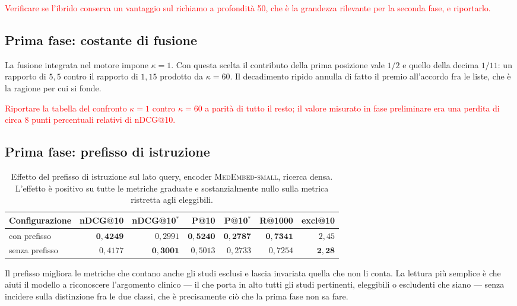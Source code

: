 \documentclass[pdflatex,sn-mathphys-num]{sn-jnl}
\theoremstyle{thmstyleone}
\theoremstyle{thmstyletwo}
\theoremstyle{thmstylethree}
\newcommand{\ev}[1]{\textcolor{red}{#1}}
\begin{document}
\ev{Verificare se l'ibrido conserva un vantaggio sul richiamo a profondità 50, che è la grandezza rilevante per la seconda fase, e riportarlo.}

\subsection{Prima fase: costante di fusione}\label{sec:res-rrf}

La fusione integrata nel motore impone $\kappa = 1$. Con questa scelta il contributo della prima posizione vale $1/2$ e quello della decima $1/11$: un rapporto di $5{,}5$ contro il rapporto di $1{,}15$ prodotto da $\kappa = 60$. Il decadimento ripido annulla di fatto il premio all'accordo fra le liste, che è la ragione per cui si fonde.

\ev{Riportare la tabella del confronto $\kappa = 1$ contro $\kappa = 60$ a parità di tutto il resto; il valore misurato in fase preliminare era una perdita di circa 8 punti percentuali relativi di nDCG@10.}

\subsection{Prima fase: prefisso di istruzione}\label{sec:res-prefisso}

\begin{table}[H]
\centering
\begin{tabular}{lrrrrrr}
\toprule
Configurazione & nDCG@10 & nDCG@10$^{*}$ & P@10 & P@10$^{*}$ & R@1000 & excl@10 \\
\midrule
con prefisso   & $\mathbf{0{,}4249}$ & $0{,}2991$ & $\mathbf{0{,}5240}$ & $\mathbf{0{,}2787}$ & $\mathbf{0{,}7341}$ & $2{,}45$ \\
senza prefisso & $0{,}4177$ & $\mathbf{0{,}3001}$ & $0{,}5013$ & $0{,}2733$ & $0{,}7254$ & $\mathbf{2{,}28}$ \\
\bottomrule
\end{tabular}
\caption{Effetto del prefisso di istruzione sul lato query, encoder \textsc{MedEmbed-small}, ricerca densa. L'effetto è positivo su tutte le metriche graduate e sostanzialmente nullo sulla metrica ristretta agli eleggibili.}
\label{tab:prefisso}
\end{table}

Il prefisso migliora le metriche che contano anche gli studi esclusi e lascia invariata quella che non li conta. La lettura più semplice è che aiuti il modello a riconoscere l'argomento clinico --- il che porta in alto tutti gli studi pertinenti, eleggibili o escludenti che siano --- senza incidere sulla distinzione fra le due classi, che è precisamente ciò che la prima fase non sa fare.
\end{document}
